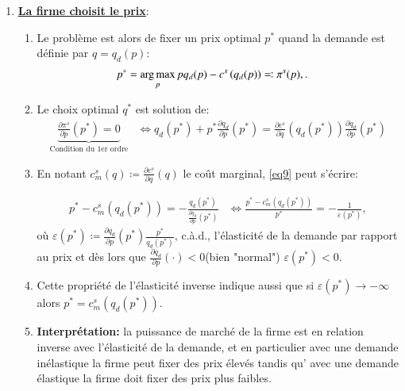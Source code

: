\begin{frame}
\begin{itemize}
\begin{enumerate}
  \item \textbf{\underline{La firme choisit le prix}}:
  \begin{enumerate}[$\cdot$]
  \item Le problème est alors de fixer un prix optimal $p^*$ quand la demande est définie par $q = q_d(p)$:
  \begin{align}
  p^* &= \argmax_{p} pq_d(p)- c^s\left(q_d(p)\right) \eqqcolon \pi^s(p), \label{eq9}.
  \end{align}
   \item  Le choix optimal $q^*$ est solution de:
  \begin{align}
   \underbrace{\frac{\partial \pi^s}{\partial p}(p^*) = 0}_{\text{Condition du 1er ordre}}&\Leftrightarrow  q_d(p^*) + p^*\frac{\partial q_d}{\partial p}(p^*) = 
   \frac{\partial c^s}{\partial q}\left(q_d(p^*)\right)\frac{\partial q_d}{\partial p}(p^*)
   \label{eq9}
  \end{align}
  \item En notant $c^s_m(q)\coloneqq  \frac{\partial c^s}{\partial q}(q)$ le coût marginal, \eqref{eq9} peut s'écrire:
  
  \begin{align}
  p^* - c^s_m\left(q_d(p^*)\right) = -\frac{q_d(p^*)}{\frac{\partial q_d}{\partial p}(p^*)} &\Leftrightarrow \frac{p^* - c^s_m\left(q_d(p^*)\right)}{p^*} = -\frac{1}{\varepsilon(p^*)},
  \label{eq10}
  \end{align}
  où $\varepsilon(p^*) \coloneqq \frac{\partial q_d}{\partial p}(p^*)\frac{p^*}{q_d(p^*)}$, c.à.d., l'élasticité de la demande par rapport au prix et dès lors que $\frac{\partial q_d}{\partial p}(\cdot)<0$(bien "normal")  $\varepsilon(p^*)<0$.
  \item Cette propriété de l'élasticité inverse indique aussi que si $\varepsilon(p^*) \to -\infty$ alors $p^* =  c^s_m\left(q_d(p^*)\right)$.
  \item \textbf{Interprétation:} la puissance de marché de la firme est en relation inverse avec l'élasticité de la demande, et en particulier  avec une demande inélastique la firme peut fixer des prix élevés tandis qu' avec une demande élastique la firme doit fixer des prix plus faibles.
  \end{enumerate}
  \end{enumerate}
  \end{itemize}
  \end{frame}

